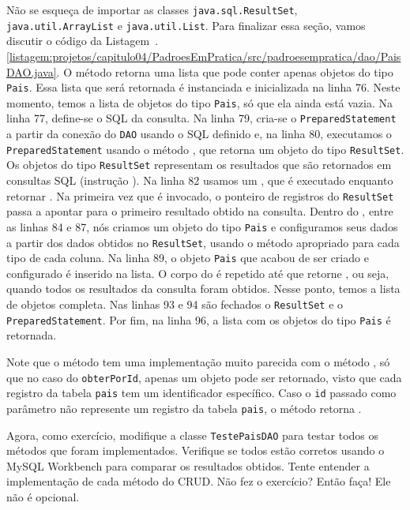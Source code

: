 Não se esqueça de importar as classes \texttt{java.sql.ResultSet}, \texttt{java.util.ArrayList} e \texttt{java.util.List}. Para finalizar essa seção, vamos discutir o código da Listagem~\thechapter.\ref{listagem:projetos/capitulo04/PadroesEmPratica/src/padroesempratica/dao/PaisDAO.java}. O método  retorna uma lista que pode conter apenas objetos do tipo \texttt{Pais}. Essa lista que será retornada é instanciada e inicializada na linha 76. Neste momento, temos a lista de objetos do tipo \texttt{Pais}, só que ela ainda está vazia. Na linha 77, define-se o SQL da consulta. Na linha 79, cria-se o \texttt{PreparedStatement} a partir da conexão do \texttt{DAO} usando o SQL definido e, na linha 80, executamos o \texttt{PreparedStatement} usando o método , que retorna um objeto do tipo \texttt{ResultSet}. Os objetos do tipo \texttt{ResultSet} representam os resultados que são retornados em consultas SQL (instrução ). Na linha 82 usamos um , que é executado enquanto  retornar . Na primeira vez que  é invocado, o ponteiro de registros do \texttt{ResultSet} passa a apontar para o primeiro resultado obtido na consulta. Dentro do , entre as linhas 84 e 87, nós criamos um objeto do tipo \texttt{Pais} e configuramos seus dados a partir dos dados obtidos no \texttt{ResultSet}, usando o método apropriado para cada tipo de cada coluna. Na linha 89, o objeto \texttt{Pais} que acabou de ser criado e configurado é inserido na lista. O corpo do  é repetido até que  retorne , ou seja, quando todos os resultados da consulta foram obtidos. Nesse ponto, temos a lista de objetos completa. Nas linhas 93 e 94 são fechados o \texttt{ResultSet} e o \texttt{PreparedStatement}. Por fim, na linha 96, a lista com os objetos do tipo \texttt{Pais} é retornada.

Note que o método  tem uma implementação muito parecida com o método , só que no caso do \texttt{obterPorId}, apenas um objeto pode ser retornado, visto que cada registro da tabela \texttt{pais} tem um identificador específico. Caso o \texttt{id} passado como parâmetro não represente um registro da tabela \texttt{pais}, o método retorna .

Agora, como exercício, modifique a classe \texttt{TestePaisDAO} para testar todos os métodos que foram implementados. Verifique se todos estão corretos usando o MySQL Workbench para comparar os resultados obtidos. Tente entender a implementação de cada método do CRUD. Não fez o exercício? Então faça! Ele não é opcional.

